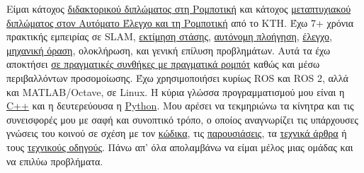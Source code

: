 \documentclass[a4paper,10pt,twoside]{article}
\begin{document}

\par{\bigskip\par}


\vspace{-0.75cm}
\begin{bw_box}
  Είμαι κάτοχος \href{https://ikee.lib.auth.gr/record/354644}{διδακτορικού διπλώματος στη Ρομποτική} και κάτοχος \href{http://kth.diva-portal.org/smash/record.jsf?pid=diva2\%3A1102597\&dswid=2875}{μεταπτυχιακού διπλώματος στον Αυτόματο Έλεγχο και τη
  Ρομποτική} από το KTH. Έχω 7+ χρόνια πρακτικής εμπειρίας σε SLAM, \href{https://github.com/li9i/fsm-lo}{εκτίμηση στάσης},
  \href{https://link.springer.com/article/10.1007/s10846-019-01086-y}{αυτόνομη πλοήγηση}, \href{https://www.tandfonline.com/doi/full/10.1080/00207179.2018.1514129}{έλεγχο}, \href{https://github.com/li9i/pandora\_vision\_2014}{μηχανική όραση}, ολοκλήρωση, και γενική επίλυση προβλημάτων.
  Αυτά τα έχω αποκτήσει \href{https://relief.web.auth.gr/\%CF\%81\%CE\%BF\%CE\%BC\%CF\%80\%CE\%BF\%CF\%84\%CE\%B9\%CE\%BA\%CE\%AC-\%CE\%BF\%CF\%87\%CE\%AE\%CE\%BC\%CE\%B1\%CF\%84\%CE\%B1/}{σε πραγματικές συνθήκες με πραγματικά ρομπότ} καθώς και μέσω περιβαλλόντων προσομοίωσης.
Έχω χρησιμοποιήσει κυρίως ROS και ROS 2, αλλά και MATLAB/Octave, σε Linux.
  Η κύρια γλώσσα προγραμματισμού μου είναι η \href{https://github.com/li9i/fsm}{C++} και η δευτερεύουσα η \href{https://github.com/cultureid-auth-ros-packages/cultureid-waypoints-following}{Python}. Μου αρέσει να τεκμηριώνω
τα κίνητρα και τις συνεισφορές μου με σαφή και συνοπτικό τρόπο, ο οποίος αναγνωρίζει
  τις υπάρχουσες γνώσεις του κοινού σε σχέση με τον \href{https://github.com/li9i/pandora_vision_2014/blob/hydro-devel/pandora_vision_hole_detector/src/hole_fusion_node/hole_fusion.cpp}{κώδικα}, τις \href{https://www.youtube.com/watch?v=xaDKjI0WkDc}{παρουσιάσεις}, τα \href{https://ieeexplore.ieee.org/abstract/document/9981228}{τεχνικά άρθρα} ή τους \href{https://github.com/li9i/ros1_humble_bridge_template}{τεχνικούς οδηγούς}. Πάνω απ' όλα απολαμβάνω να είμαι μέλος μιας ομάδας και να επιλύω προβλήματα.
\end{bw_box}
\end{document}
